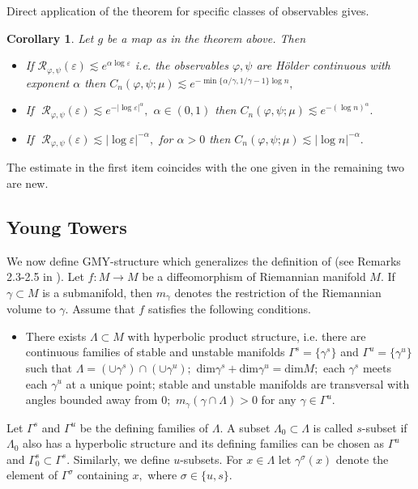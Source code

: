 \documentclass[a4paper,12pt]{amsart}
\numberwithin{equation}{section}
\newtheorem{corollary}[theorem]{Corollary}
\begin{document}
Direct application of the theorem for specific classes of
observables gives.

\begin{corollary}\label{sol}
Let $g$ be a map as in the theorem above. Then
\begin{itemize}
\item[(i)]If $\mathcal R_{\varphi, \psi}(\varepsilon)\lesssim
e^{\alpha\log\varepsilon}$ i.e. the observables $\varphi, \psi$ are
H\"older continuous with exponent $\alpha$ then $C_n(\varphi, \psi;
\mu)\lesssim e^{-\min\{\alpha/\gamma, 1/\gamma-1\}\log n},$

\item[(ii)] If\,\, $\mathcal R_{\varphi, \psi}(\varepsilon)\lesssim e^{-|\log
\varepsilon|^{\alpha}},$ $\alpha\in(0, 1)$  then $C_n(\varphi, \psi;
\mu)\lesssim e^{-(\log n)^\alpha}.$

\item[(iii)] If\,\, $\mathcal R_{\varphi, \psi}(\varepsilon)\lesssim |\log
\varepsilon|^{-\alpha},$ for $\alpha>0$  then $C_n(\varphi, \psi;
\mu)\lesssim |\log n|^{-\alpha}.$
\end{itemize}
\end{corollary}

The estimate in the first item coincides with the one given in
\cite{AlvPin} the remaining two are new.

\subsection{Young Towers} We now define GMY-structure
\cite{AlvPin}  which generalizes the definition of \cite{Y1} (see
Remarks 2.3-2.5 in \cite{AlvPin}). Let $f:M\to M$ be a
diffeomorphism of Riemannian manifold $M.$ If $\gamma\subset M$ is a
submanifold, then $m_\gamma$ denotes the restriction of the
Riemannian volume to $\gamma.$ Assume that $f$ satisfies the
following conditions.

\begin{itemize}
\item[(A1)] There exists $\Lambda\subset M$ with hyperbolic product
structure, i.e. there are continuous families of stable and unstable
manifolds $\Gamma^s=\{\gamma^s\}$ and $\Gamma^u=\{\gamma^u\}$ such
that $\Lambda=(\cup\gamma^s)\cap(\cup\gamma^u);$
dim$\gamma^s+\text{dim}\gamma^u=\text{dim}M;$ each $\gamma^s$ meets
each $\gamma^u$ at a unique point; stable and unstable manifolds are
transversal with angles bounded away from $0;$
$m_{\gamma}(\gamma\cap \Lambda)>0$ for any $\gamma\in\Gamma^u.$
\end{itemize}
Let $\Gamma^s$ and $\Gamma^u$ be the defining families of $\Lambda.$
A subset $\Lambda_0\subset\Lambda$ is called $s$-subset if
$\Lambda_0$ also has a hyperbolic structure and its defining
families can be chosen as $\Gamma^u$ and
$\Gamma^s_0\subset\Gamma^s.$ Similarly, we define $u$-subsets. For
$x\in\Lambda$ let $\gamma^\sigma(x)$ denote the element of
$\Gamma^\sigma$ containing $x,$ where $\sigma\in \{u, s\}.$
\end{document}
